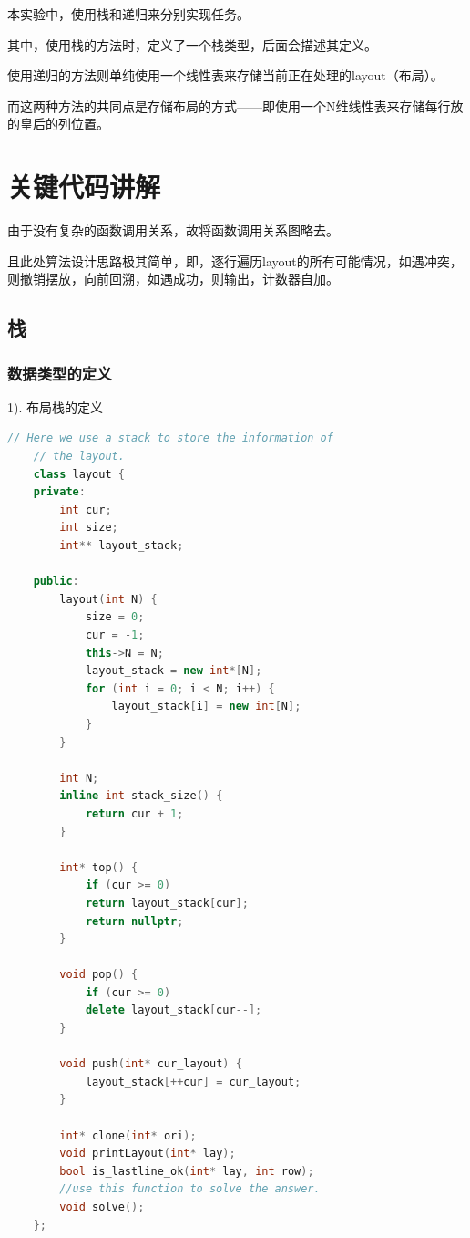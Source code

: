 \documentclass[UTF8]{article}
\begin{document}
	本实验中，使用栈和递归来分别实现任务。\par
	其中，使用栈的方法时，定义了一个栈类型，后面会描述其定义。\par
	使用递归的方法则单纯使用一个线性表来存储当前正在处理的layout（布局）。\par
	而这两种方法的共同点是存储布局的方式——即使用一个N维线性表来存储每行放的皇后的列位置。\par
	
	
	\section{关键代码讲解}
	由于没有复杂的函数调用关系，故将函数调用关系图略去。\par
	且此处算法设计思路极其简单，即，逐行遍历layout的所有可能情况，如遇冲突，则撤销摆放，向前回溯，如遇成功，则输出，计数器自加。
	\subsection{栈}
	\subsubsection{数据类型的定义}
	1). 布局栈的定义
	\begin{lstlisting}[language=C++]
	// Here we use a stack to store the information of 
	// the layout.
	class layout {
	private:
		int cur;
		int size;
		int** layout_stack;
		
	public:
		layout(int N) {
			size = 0;
			cur = -1;
			this->N = N;
			layout_stack = new int*[N];
			for (int i = 0; i < N; i++) {
				layout_stack[i] = new int[N];
			}
		}
		
		int N;
		inline int stack_size() {
			return cur + 1;
		}
		
		int* top() {
			if (cur >= 0)
			return layout_stack[cur];
			return nullptr;
		}
		
		void pop() {
			if (cur >= 0) 
			delete layout_stack[cur--];
		}
		
		void push(int* cur_layout) {
			layout_stack[++cur] = cur_layout;
		}
		
		int* clone(int* ori);
		void printLayout(int* lay);
		bool is_lastline_ok(int* lay, int row);
		//use this function to solve the answer.
		void solve();
	};
	\end{lstlisting}
	
\end{document}
